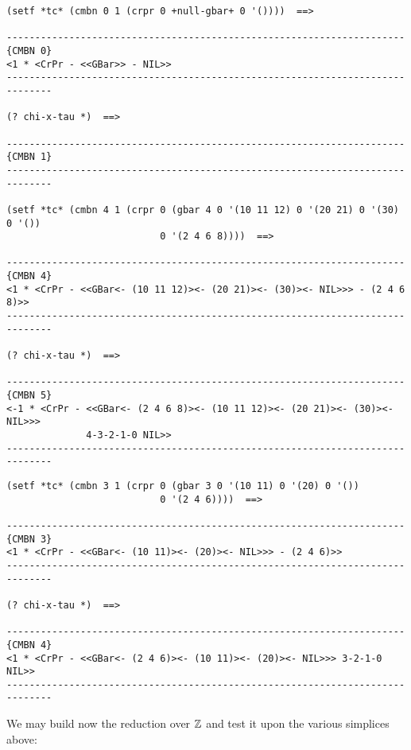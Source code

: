 {\footnotesize\begin{verbatim}
(setf *tc* (cmbn 0 1 (crpr 0 +null-gbar+ 0 '())))  ==>

----------------------------------------------------------------------{CMBN 0}
<1 * <CrPr - <<GBar>> - NIL>>
------------------------------------------------------------------------------

(? chi-x-tau *)  ==>

----------------------------------------------------------------------{CMBN 1}
------------------------------------------------------------------------------

(setf *tc* (cmbn 4 1 (crpr 0 (gbar 4 0 '(10 11 12) 0 '(20 21) 0 '(30) 0 '())
                           0 '(2 4 6 8))))  ==>

----------------------------------------------------------------------{CMBN 4}
<1 * <CrPr - <<GBar<- (10 11 12)><- (20 21)><- (30)><- NIL>>> - (2 4 6 8)>>
------------------------------------------------------------------------------

(? chi-x-tau *)  ==>

----------------------------------------------------------------------{CMBN 5}
<-1 * <CrPr - <<GBar<- (2 4 6 8)><- (10 11 12)><- (20 21)><- (30)><- NIL>>> 
              4-3-2-1-0 NIL>>
------------------------------------------------------------------------------
\end{verbatim}}
\newpage
{\footnotesize\begin{verbatim}
(setf *tc* (cmbn 3 1 (crpr 0 (gbar 3 0 '(10 11) 0 '(20) 0 '())
                           0 '(2 4 6))))  ==>

----------------------------------------------------------------------{CMBN 3}
<1 * <CrPr - <<GBar<- (10 11)><- (20)><- NIL>>> - (2 4 6)>>
------------------------------------------------------------------------------

(? chi-x-tau *)  ==>

----------------------------------------------------------------------{CMBN 4}
<1 * <CrPr - <<GBar<- (2 4 6)><- (10 11)><- (20)><- NIL>>> 3-2-1-0 NIL>>
------------------------------------------------------------------------------
\end{verbatim}}
We may build now the reduction over ${{\Bbb Z}}$ and test it upon the various simplices
above:
